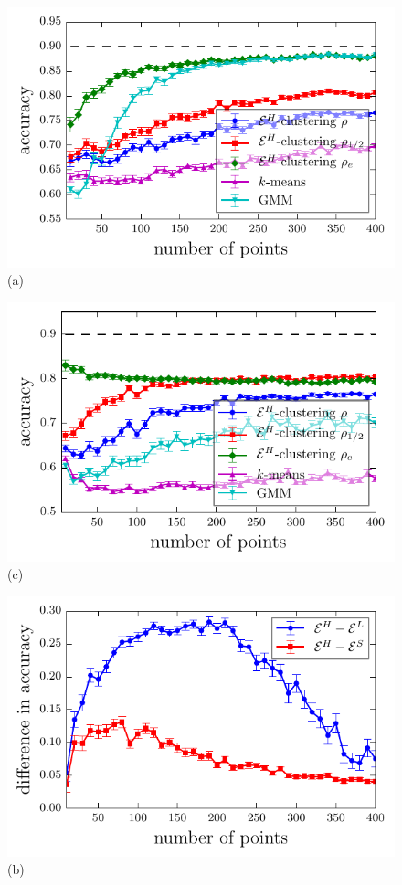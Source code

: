 \documentclass[aps,preprint,nofootinbib,floatfix]{revtex4-1}
\begin{document}
\begin{figure}
\begin{minipage}{0.49\textwidth}
\centering
\includegraphics[width=1\textwidth]{normal_kernels.pdf}\\[-1.0em](a)
\end{minipage}
\begin{minipage}{0.49\textwidth}
\centering
\includegraphics[width=1\textwidth]{lognormal_kernels.pdf}\\[-1.0em](c)
\end{minipage}
\begin{minipage}{0.49\textwidth}
\centering
\includegraphics[width=1\textwidth]{normal_kernels_difference.pdf}\\[-1.0em](b)

\end{minipage}
\end{figure}
\end{document}
